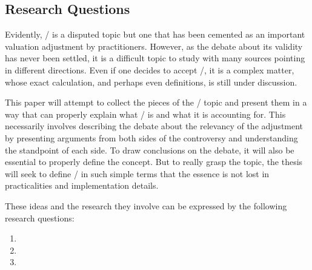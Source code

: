 \documentclass[main.tex]{subfiles}
\begin{document}
    \subsection{Research Questions}
        
    Evidently, \FVA/ is a disputed topic 
    but one that has been cemented as an important valuation adjustment by practitioners.
    However, as the debate about its validity has never been settled,
    it is a difficult topic to study with many sources pointing in different directions.
    Even if one decides to accept \FVA/, it is a complex matter,
    whose exact calculation, and perhaps even definitions, is still under discussion.

    This paper will attempt to collect the pieces of the \FVA/ topic
    and present them in a way that can properly explain what \FVA/ is and what it is accounting for.
    This necessarily involves describing the debate about the relevancy of the adjustment
    by presenting arguments from both sides of the controversy 
    and understanding the standpoint of each side.
    To draw conclusions on the debate, it will also be essential to properly define the concept.
    But to really grasp the topic, the thesis will seek to define \FVA/ in such simple terms 
    that the essence is not lost in practicalities and implementation details.

    These ideas and the research they involve can be expressed by the following research questions:
    \begin{enumerate}
        \item \researchQuestionFundingCosts
        \item \researchQuestionFvaDebate
        \item \researchQuestionFvaImplications
    \end{enumerate}
\end{document}
